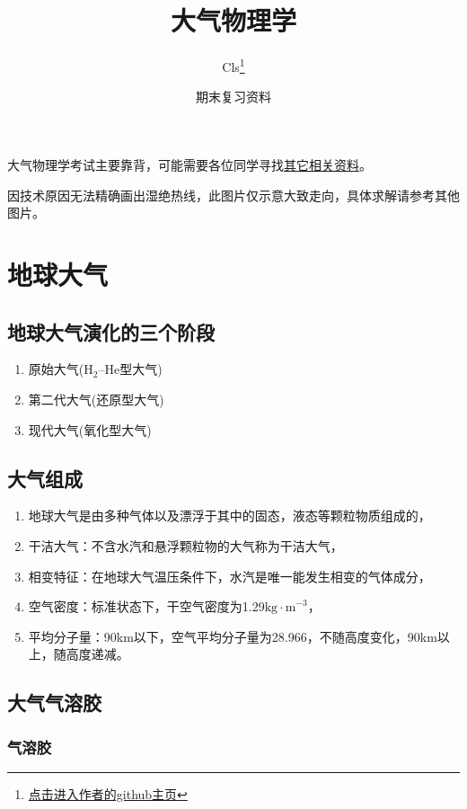 \documentclass[UTF8,a4paper,11pt,oneside]{ctexbook}
\title{大气物理学}
\author{Cls\thanks{\href{https://github.com/Clignniis}{点击进入作者的github主页}}}
\date{期末复习资料}
\begin{document}
\frontmatter 
\maketitle

大气物理学考试主要靠背，可能需要各位同学寻找\href{https://github.com/ZhangtongCN}{其它相关资料}。

因技术原因无法精确画出湿绝热线，此图片仅示意大致走向，具体求解请参考其他图片。

\tableofcontents

\mainmatter

\chapter{地球大气}

\section{地球大气演化的三个阶段}
\begin{enumerate}
    \item 原始大气(\(\mathrm{H}_2\)--\(\mathrm{He}\)型大气)
    \item 第二代大气(还原型大气)
    \item 现代大气(氧化型大气)
\end{enumerate}

\section{大气组成}
\begin{enumerate}
    \item 地球大气是由多种气体以及漂浮于其中的固态，液态等颗粒物质组成的，
    \item 干洁大气：不含水汽和悬浮颗粒物的大气称为干洁大气，
    \item 相变特征：在地球大气温压条件下，水汽是唯一能发生相变的气体成分，
    \item 空气密度：标准状态下，干空气密度为1.29\(\mathrm{kg\cdot{}m}^{-3}\)，
    \item 平均分子量：90km以下，空气平均分子量为28.966，不随高度变化，90km以上，随高度递减。
\end{enumerate}

\section{大气气溶胶}

\subsection{气溶胶}
\end{document}
